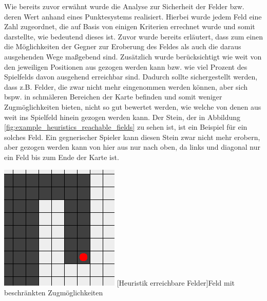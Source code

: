 \documentclass[12pt,a4paper,bibliography=totocnumbered,listof=totocnumbered]{article}
\begin{document}
Wie bereits zuvor erwähnt wurde die Analyse zur Sicherheit der Felder bzw. deren Wert anhand eines Punktesystems realisiert. Hierbei wurde jedem Feld eine Zahl zugeordnet, die auf Basis von einigen Kriterien errechnet wurde und somit darstellte, wie bedeutend dieses ist. Zuvor wurde bereits erläutert, dass zum einen die Möglichkeiten der Gegner zur Eroberung des Feldes als auch die daraus ausgehenden Wege maßgebend sind. Zusätzlich wurde berücksichtigt wie weit von den jeweiligen Positionen aus gezogen werden kann bzw. wie viel Prozent des Spielfelds davon ausgehend erreichbar sind. Dadurch sollte sichergestellt werden, dass z.B. Felder, die zwar nicht mehr eingenommen werden können, aber sich bspw. in schmäleren Bereichen der Karte befinden und somit weniger Zugmöglichkeiten bieten, nicht so gut bewertet werden, wie welche von denen aus weit ins Spielfeld hinein gezogen werden kann. Der Stein, der in Abbildung \ref{fig:example_heuristics_reachable_fields} zu sehen ist, ist ein Beispiel für ein solches Feld. Ein gegnerischer Spieler kann diesen Stein zwar nicht mehr erobern, aber gezogen werden kann von hier aus nur nach oben, da links und diagonal nur ein Feld bis zum Ende der Karte ist.

\vspace{1em}
\begin{minipage}{\linewidth}
	\centering
	\includegraphics[width=0.5\linewidth]{pics/heuristics_reachable_fields.png}
	[Heuristik erreichbare Felder]{Feld mit beschränkten Zugmöglichkeiten}
	\label{fig:example_heuristics_reachable_fields}
\end{minipage}
\\
\end{document}
